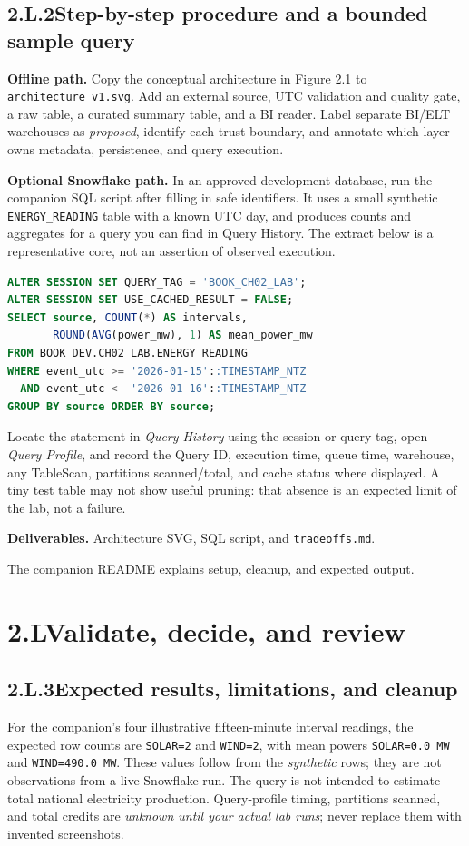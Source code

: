 \documentclass[11pt,twoside]{article}
\newcommand{\topic}[2]{\subsection*{#1\quad #2}}
\begin{document}
\topic{2.L.2}{Step-by-step procedure and a bounded sample query}
\textbf{Offline path.} Copy the conceptual architecture in Figure 2.1 to \texttt{architecture\_v1.svg}. Add an external source, UTC validation and quality gate, a raw table, a curated summary table, and a BI reader. Label separate BI/ELT warehouses as \emph{proposed}, identify each trust boundary, and annotate which layer owns metadata, persistence, and query execution.

\textbf{Optional Snowflake path.} In an approved development database, run the companion SQL script after filling in safe identifiers. It uses a small synthetic \texttt{ENERGY\_READING} table with a known UTC day, and produces counts and aggregates for a query you can find in Query History. The extract below is a representative core, not an assertion of observed execution.

\begin{lstlisting}[language=SQL,caption={Core of the optional teaching query; synthetic records only.}]
ALTER SESSION SET QUERY_TAG = 'BOOK_CH02_LAB';
ALTER SESSION SET USE_CACHED_RESULT = FALSE;
SELECT source, COUNT(*) AS intervals,
       ROUND(AVG(power_mw), 1) AS mean_power_mw
FROM BOOK_DEV.CH02_LAB.ENERGY_READING
WHERE event_utc >= '2026-01-15'::TIMESTAMP_NTZ
  AND event_utc <  '2026-01-16'::TIMESTAMP_NTZ
GROUP BY source ORDER BY source;
\end{lstlisting}

Locate the statement in \emph{Query History} using the session or query tag, open \emph{Query Profile}, and record the Query ID, execution time, queue time, warehouse, any TableScan, partitions scanned/total, and cache status where displayed. A tiny test table may not show useful pruning: that absence is an expected limit of the lab, not a failure.

\textbf{Deliverables.} Architecture SVG, SQL script, and \texttt{tradeoffs.md}.\par The companion README explains setup, cleanup, and expected output.

\newpage
\section*{2.L\quad Validate, decide, and review}
\topic{2.L.3}{Expected results, limitations, and cleanup}
For the companion's four illustrative fifteen-minute interval readings, the expected row counts are \texttt{SOLAR=2} and \texttt{WIND=2}, with mean powers \texttt{SOLAR=0.0 MW} and \texttt{WIND=490.0 MW}. These values follow from the \emph{synthetic} rows; they are not observations from a live Snowflake run. The query is not intended to estimate total national electricity production. Query-profile timing, partitions scanned, and total credits are \emph{unknown until your actual lab runs}; never replace them with invented screenshots.
\end{document}
